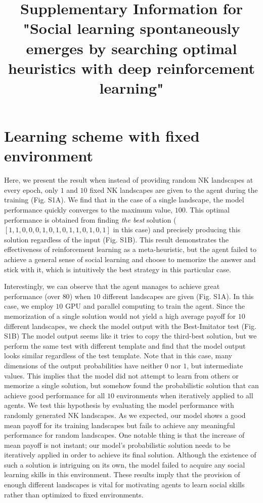 \documentclass{nature}
\title{Supplementary Information for "Social learning spontaneously emerges by searching optimal heuristics with deep reinforcement learning"}
\begin{document}
\maketitle

\section{Learning scheme with fixed environment}

Here, we present the result when instead of providing random NK landscapes at every epoch, only $1$ and $10$ fixed NK landscapes are given to the agent during the training (Fig. S1A). We find that in the case of a single landscape, the model performance quickly converges to the maximum value, $100$. This optimal performance is obtained from finding \textit{the best} solution ($[1, 1, 0, 0, 0, 1, 0, 1, 0, 1, 1, 0, 1, 0, 1]$ in this case) and precisely producing this solution regardless of the input (Fig. S1B). This result demonstrates the effectiveness of reinforcement learning as a meta-heuristic, but the agent failed to achieve a general sense of social learning and choose to memorize the answer and stick with it, which is intuitively the best strategy in this particular case. 

Interestingly, we can observe that the agent manages to achieve great performance (over $80$) when $10$ different landscapes are given (Fig. S1A). In this case, we employ $10$ GPU and parallel computing to train the agent. Since the memorization of a single solution would not yield a high average payoff for $10$ different landscapes, we check the model output with the Best-Imitator test (Fig. S1B) The model output seems like it tries to copy the third-best solution, but we perform the same test with different template and find that the model output looks similar regardless of the test template. Note that in this case, many dimensions of the output probabilities have neither $0$ nor $1$, but intermediate values. This implies that the model did not attempt to learn from others or memorize a single solution, but somehow found the probabilistic solution that can achieve good performance for all $10$ environments when iteratively applied to all agents. We test this hypothesis by evaluating the model performance with randomly generated NK landscapes. As we expected, our model shows a good mean payoff for its training landscapes but fails to achieve any meaningful performance for random landscapes. One notable thing is that the increase of mean payoff is not instant; our model's probabilistic solution needs to be iteratively applied in order to achieve its final solution. Although the existence of such a solution is intriguing on its own, the model failed to acquire any social learning skills in this environment. These results imply that the provision of enough different landscapes is vital for motivating agents to learn social skills rather than optimized to fixed environments.
\end{document}
